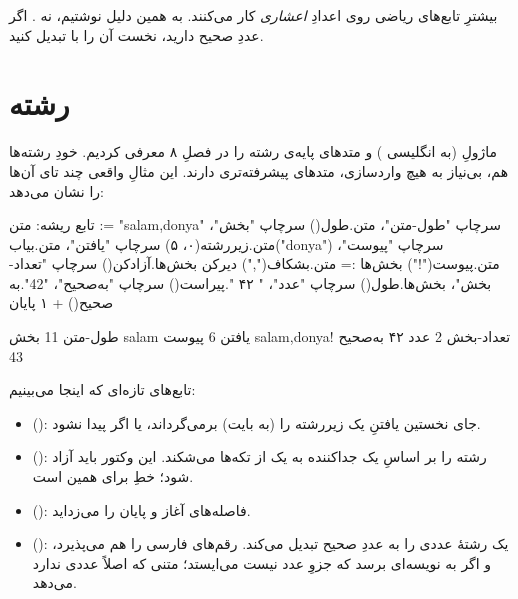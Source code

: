 \begin{warn}
\begin{sloppypar}
بیشترِ تابع‌های ریاضی روی اعدادِ \emph{اعشاری} کار می‌کنند. به همین دلیل
 نوشتیم، نه . اگر عددِ صحیح دارید،
نخست آن را با  تبدیل کنید.
\end{sloppypar}
\end{warn}

\section{رشته}

ماژولِ  (به انگلیسی ) و متدهای پایه‌ی رشته را در فصلِ ۸
معرفی کردیم. خودِ رشته‌ها هم، بی‌نیاز به هیچ واردسازی، متدهای پیشرفته‌تری
دارند. این مثالِ واقعی چند تای آن‌ها را نشان می‌دهد:

\begin{salamfa}
تابع ریشه:
    متن := "salam,donya"
    سرچاپ "طول-متن"، متن.طول()
    سرچاپ "بخش"، متن.زیررشته(۰، ۵)
    سرچاپ "یافتن"، متن.بیاب("donya")
    سرچاپ "پیوست"، متن.پیوست("!")
    بخش‌ها := متن.بشکاف(",")
    دیرکن بخش‌ها.آزادکن()
    سرچاپ "تعداد-بخش"، بخش‌ها.طول()
    سرچاپ "عدد"، " ۴۲ ".پیراست()
    سرچاپ "به‌صحیح"، "42".به صحیح() + ۱
پایان
\end{salamfa}

\begin{progoutfa}
طول-متن 11
بخش salam
یافتن 6
پیوست salam,donya!
تعداد-بخش 2
عدد ۴۲
به‌صحیح 43
\end{progoutfa}

تابع‌های تازه‌ای که اینجا می‌بینیم:
\begin{itemize}
  \item {} (): جای نخستین یافتنِ یک زیررشته را
        (به بایت) برمی‌گرداند، یا  اگر پیدا نشود.
  \item {} (): رشته را بر اساسِ یک جداکننده به یک
         از تکه‌ها می‌شکند. این وکتور باید آزاد شود؛ خطِ
         برای همین است.
  \item {} (): فاصله‌های آغاز و پایان را می‌زداید.
  \item {} (): یک رشتهٔ عددی را به عددِ صحیح تبدیل
        می‌کند. رقم‌های فارسی را هم می‌پذیرد، و اگر به نویسه‌ای برسد که جزوِ عدد
        نیست می‌ایستد؛ متنی که اصلاً عددی ندارد  می‌دهد.
\end{itemize}

